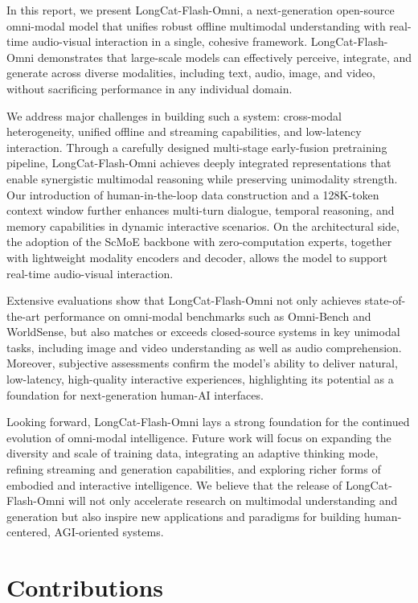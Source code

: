 \documentclass{article}
\newcommand{\longcat}{LongCat-Flash-Omni\xspace}
\begin{document}
In this report, we present \longcat, a next-generation open-source omni-modal model that unifies robust offline multimodal understanding with real-time audio-visual interaction in a single, cohesive framework. \longcat demonstrates that large-scale models can effectively perceive, integrate, and generate across diverse modalities, including text, audio, image, and video, without sacrificing performance in any individual domain.

We address major challenges in building such a system: cross-modal heterogeneity, unified offline and streaming capabilities, and low-latency interaction. Through a carefully designed multi-stage early-fusion pretraining pipeline, \longcat achieves deeply integrated representations that enable synergistic multimodal reasoning while preserving unimodality strength. Our introduction of human-in-the-loop data construction and a 128K-token context window further enhances multi-turn dialogue, temporal reasoning, and memory capabilities in dynamic interactive scenarios.
On the architectural side, the adoption of the ScMoE backbone with zero-computation experts, together with lightweight modality encoders and decoder, allows the model to support real-time audio-visual interaction.

Extensive evaluations show that \longcat not only achieves state-of-the-art performance on omni-modal benchmarks such as Omni-Bench and WorldSense, but also matches or exceeds closed-source systems in key unimodal tasks, including image and video understanding as well as audio comprehension. Moreover, subjective assessments confirm the model’s ability to deliver natural, low-latency, high-quality interactive experiences, highlighting its potential as a foundation for next-generation human-AI interfaces.

Looking forward, \longcat lays a strong foundation for the continued evolution of omni-modal intelligence. Future work will focus on expanding the diversity and scale of training data, integrating an adaptive thinking mode, refining streaming and generation capabilities, and exploring richer forms of embodied and interactive intelligence. We believe that the release of \longcat will not only accelerate research on multimodal understanding and generation but also inspire new applications and paradigms for building human-centered, AGI-oriented systems.


\clearpage

\section{Contributions}
\end{document}
